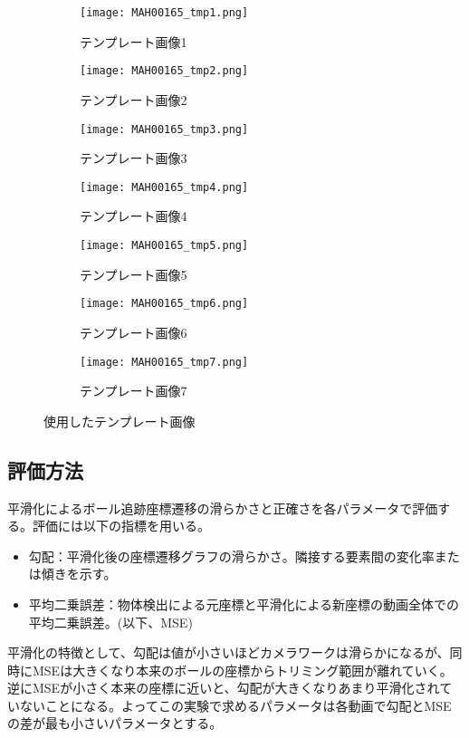 \documentclass[11pt,a4j]{jreport}
\begin{document}
\vspace{\baselineskip}
\begin{figure}[htbp]
    \centering
    \begin{subfigure}{0.3\textwidth}
        \centering
        \texttt{[image: MAH00165\_tmp1.png]}
        \caption{テンプレート画像1}
    \end{subfigure}%
    \begin{subfigure}{0.3\textwidth}
        \centering
        \texttt{[image: MAH00165\_tmp2.png]}
        \caption{テンプレート画像2}
    \end{subfigure}%
    \begin{subfigure}{0.3\textwidth}
        \centering
        \texttt{[image: MAH00165\_tmp3.png]}
        \caption{テンプレート画像3}
    \end{subfigure}

    \begin{subfigure}{0.25\textwidth}
        \centering
        \texttt{[image: MAH00165\_tmp4.png]}
        \caption{テンプレート画像4}
    \end{subfigure}%
    \begin{subfigure}{0.25\textwidth}
        \centering
        \texttt{[image: MAH00165\_tmp5.png]}
        \caption{テンプレート画像5}
    \end{subfigure}%
    \begin{subfigure}{0.25\textwidth}
        \centering
        \texttt{[image: MAH00165\_tmp6.png]}
        \caption{テンプレート画像6}
    \end{subfigure}%
    \begin{subfigure}{0.25\textwidth}
        \centering
        \texttt{[image: MAH00165\_tmp7.png]}
        \caption{テンプレート画像7}
    \end{subfigure}%
    \caption{使用したテンプレート画像}
    \label{fig:images}
\end{figure}

\subsection{評価方法}
平滑化によるボール追跡座標遷移の滑らかさと正確さを各パラメータで評価する。評価には以下の指標を用いる。

\begin{itemize}
    \item 勾配：平滑化後の座標遷移グラフの滑らかさ。隣接する要素間の変化率または傾きを示す。
    \item 平均二乗誤差：物体検出による元座標と平滑化による新座標の動画全体での平均二乗誤差。(以下、MSE)
\end{itemize}
平滑化の特徴として、勾配は値が小さいほどカメラワークは滑らかになるが、同時にMSEは大きくなり本来のボールの座標からトリミング範囲が離れていく。逆にMSEが小さく本来の座標に近いと、勾配が大きくなりあまり平滑化されていないことになる。よってこの実験で求めるパラメータは各動画で勾配とMSEの差が最も小さいパラメータとする。
\end{document}
